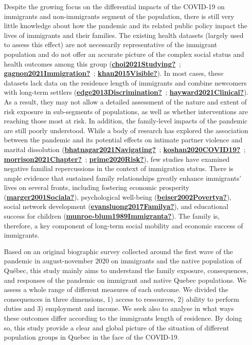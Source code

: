 \documentclass[
]{article}
\begin{document}
Despite the growing focus on the differential impacts of the COVID-19 on
immigrants and non-immigrants segment of the population, there is still very
little knowledge about how the pandemic and its related public policy impact the
lives of immigrants and their families. The existing health datasets (largely
used to assess this effect) are not necessarily representative of the immigrant
population and do not offer an accurate picture of the complex social status and
health outcomes among this group (\protect\hyperlink{ref-choi2021Studying}{\textbf{choi2021Studying?}}~; \protect\hyperlink{ref-gagnon2021Immigration}{\textbf{gagnon2021Immigration?}}~; \protect\hyperlink{ref-khan2015Visible}{\textbf{khan2015Visible?}}). In most cases, these datasets lack data on the residence
length of immigrants and combine newcomers with long-term settlers
(\protect\hyperlink{ref-edge2013Discrimination}{\textbf{edge2013Discrimination?}}~; \protect\hyperlink{ref-hayward2021Clinical}{\textbf{hayward2021Clinical?}}). As a result, they may not allow
a detailed assessment of the nature and extent of risk exposure in sub-segments
of populations, as well as whether interventions are reaching those most at
risk. In addition, the family-level impacts of the pandemic are still poorly
understood. While a body of research has explored the association between the
pandemic and its potential effects on intimate partner violence and marital
dissolution (\protect\hyperlink{ref-bhatnagar2021Navigating}{\textbf{bhatnagar2021Navigating?}}~; \protect\hyperlink{ref-koshan2020COVID19}{\textbf{koshan2020COVID19?}}~; \protect\hyperlink{ref-morrison2021Chapter}{\textbf{morrison2021Chapter?}}~; \protect\hyperlink{ref-prime2020Risk}{\textbf{prime2020Risk?}}), few studies have examined negative familial repercussions in
the context of immigration status. There is ample evidence that sustained family
relationships greatly enhance immigrants' lives on several fronts, including
fostering economic prosperity (\protect\hyperlink{ref-marger2001Sociala}{\textbf{marger2001Sociala?}}), psychological well-being
(\protect\hyperlink{ref-beiser2002Povertya}{\textbf{beiser2002Povertya?}}), social network development (\protect\hyperlink{ref-evansluong2017Familya}{\textbf{evansluong2017Familya?}}), and
educational success for children (\protect\hyperlink{ref-munroe-blum1989Immigranta}{\textbf{munroe-blum1989Immigranta?}}). The family is,
therefore, a key component of long-term social mobility and economic success of
immigrants.

Based on an original biographic survey collected around the first wave of the
pandemic in august-november 2020 on immigrants and the native population of
Québec, this study mainly aims to understand the family exposure, consequences,
and responses of the pandemic on immigrant and native Quebec populations. We
assess a whole range of different measures of each outcome. We divided the
consequences in three dimensions, 1) access to ressources, 2) ability to perform
duties and 3) employment and income. We seek also to analyse in what ways these
outcomes differ according to the immigrants length of residence. By doing so,
this study provide a clear and global picture of the situation of different
population groups in Quebec in the face of the COVID-19.
\end{document}
